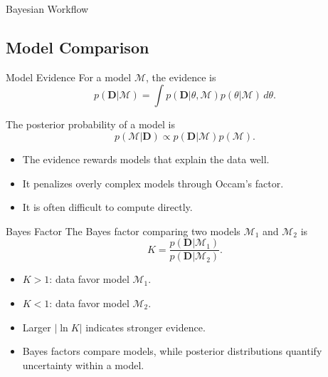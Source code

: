 \documentclass[a4paper, 10pt, onepage]{elegantbook}
\begin{document}
{\begin{frame}{Bayesian Workflow}
\end{frame}

\subsection{Model Comparison}

\begin{frame}{Model Evidence}
  For a model \(\mathcal{M}\), the evidence is
  \[
    p(\mathbf{D}|\mathcal{M})
    =
    \int
    p(\mathbf{D}|\theta,\mathcal{M})
    p(\theta|\mathcal{M})
    \,d\theta.
  \]

  The posterior probability of a model is
  \[
    p(\mathcal{M}|\mathbf{D})
    \propto
    p(\mathbf{D}|\mathcal{M})p(\mathcal{M}).
  \]

  \begin{itemize}
    \item The evidence rewards models that explain the data well.
    \item It penalizes overly complex models through Occam's factor.
    \item It is often difficult to compute directly.
  \end{itemize}
\end{frame}

\begin{frame}{Bayes Factor}
  The Bayes factor comparing two models \(\mathcal{M}_1\) and \(\mathcal{M}_2\) is
  \[
    K
    =
    \frac{
      p(\mathbf{D}|\mathcal{M}_1)
    }{
      p(\mathbf{D}|\mathcal{M}_2)
    }.
  \]

  \begin{itemize}
    \item \(K>1\): data favor model \(\mathcal{M}_1\).
    \item \(K<1\): data favor model \(\mathcal{M}_2\).
    \item Larger \(| \ln K |\) indicates stronger evidence.
  \end{itemize}

  \begin{itemize}
    \item Bayes factors compare models, while posterior distributions quantify uncertainty within a model.
  \end{itemize}
\end{frame}

}
\end{document}
